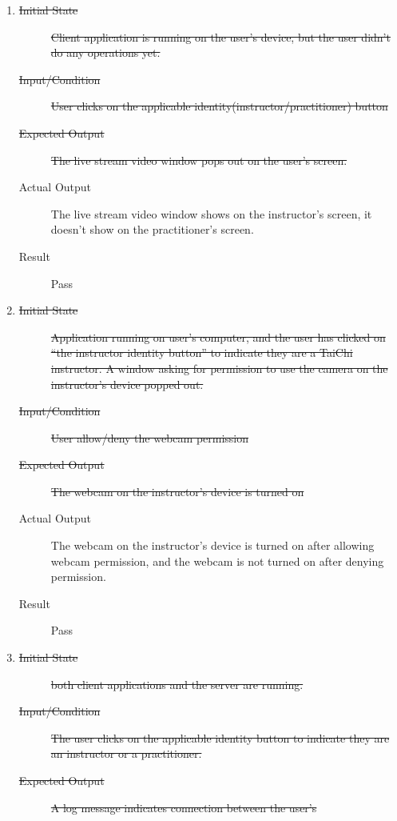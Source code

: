 \documentclass[12pt, titlepage]{article}
\begin{document}
\begin{enumerate}[FR-T1]
  \item \label{FRT1}
    \begin{description}
    \item[\sout{Initial State}]\sout{ Client application is running on the user's device, but
      the user didn’t do any operations yet.
    }\item[\sout{Input/Condition}]\sout{ User clicks on the applicable
      identity(instructor/practitioner) button
    }\item[\sout{Expected Output}]\sout{ The live stream video window pops out on the user's
      screen.
    }\item[Actual Output] The live stream video window shows on the instructor's
      screen, it doesn't show on the practitioner's screen.
    \item[Result] Pass
    \end{description}
  \item \label{FRT2}
    \begin{description}
    \item[\sout{Initial State}]\sout{ Application running on user’s computer, and the user has
      clicked on “the instructor identity button” to indicate they are a TaiChi
      instructor. A window asking for permission to use the camera on the
      instructor's device popped out.
    }\item[\sout{Input/Condition}]\sout{ User allow/deny the webcam permission
    }\item[\sout{Expected Output}]\sout{ The webcam on the instructor’s device is turned on
    }\item[Actual Output] The webcam on the instructor’s device is turned on after
      allowing webcam permission, and the webcam is not turned on after denying
      permission.
    \item[Result] Pass
    \end{description}
  \item \label{FRT3}
    \begin{description}
    \item[\sout{Initial State}]\sout{ both client applications and the server are running.
    }\item[\sout{Input/Condition}]\sout{ The user clicks on the applicable identity button to
      indicate they are an instructor or a practitioner.
    }\item[\sout{Expected Output}]\sout{ A log message indicates connection between the user’s
}
\end{description}
\end{enumerate}
\end{document}
